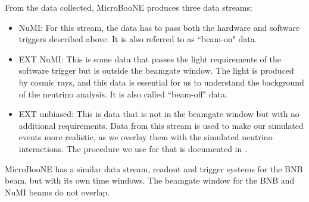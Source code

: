 From the data collected, MicroBooNE produces three data streams:
\begin{itemize}
    \item NuMI: For this stream, the data has to pass both the hardware and software triggers described above. It is also referred to as ``beam-on" data. 
    \item EXT NuMI: This is some data that passes the light requirements of the software trigger but is outside the beamgate window. The light is produced by cosmic rays, and this data is essential for us to understand the background of the neutrino analysis. It is also called ``beam-off" data. 
    \item EXT unbiased: This is data that is not in the beamgate window but with no additional requirements. Data from this stream is used to make our simulated events more realistic, as we overlay them with the simulated neutrino interactions. The procedure we use for that is documented in \cite{afro_phd}. 
\end{itemize}

MicroBooNE has a similar data stream, readout and trigger systems for the BNB beam, but with its own time windows. The beamgate window for the BNB and NuMI beams do not overlap. 

